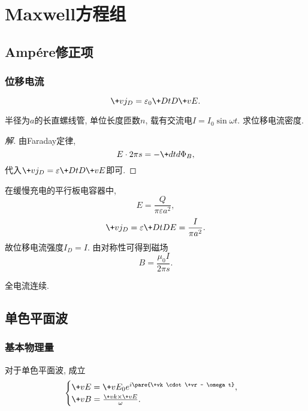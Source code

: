 \documentclass[hidelinks]{ctexart}
\begin{document}

\section{Maxwell方程组} %
\label{sec:maxwell方程组}

\subsection{\texorpdfstring{Amp\'ere修正项}{Ampere修正项}} %
\label{sub:Ampere修正项}

\subsubsection{位移电流} %
\label{ssub:位移电流}

\[ \+vj_D = \varepsilon_0 \+DtD{\+vE}. \]
\begin{ex}
    半径为$a$的长直螺线管, 单位长度匝数$n$, 载有交流电$I=I_0 \sin \omega t$. 求位移电流密度.
\end{ex}
\begin{proof}
    [解]
    由Faraday定律,
    \[ E\cdot 2\pi s = -\+dtd{\Phi_B}, \]
    代入$\+vj_D = \varepsilon \+DtD{\+vE}$即可.
\end{proof}
\begin{ex}
    在缓慢充电的平行板电容器中,
    \[ E = \frac{Q}{\pi\varepsilon a^2}, \]
    \[ \+vj_D = \varepsilon\+DtDE = \frac{I}{\pi a^2}. \]
    故位移电流强度$I_D = I$. 由对称性可得到磁场
    \[ B = \frac{\mu_0 I}{2\pi s}. \]
\end{ex}
\begin{finale}
    全电流连续.
\end{finale}



\subsection{单色平面波} %
\label{sub:单色平面波}

\subsubsection{基本物理量} %
\label{ssub:基本物理量}

对于单色平面波, 成立
\[ \displaystyle \begin{cases}
    \+vE = \+vE_0 e^{i\pare{\+vk \cdot \+vr - \omega t}},\\
    \+vB = \frac{\+vk\times\+vE}{\omega}.
    \end{cases} \]
\end{document}
